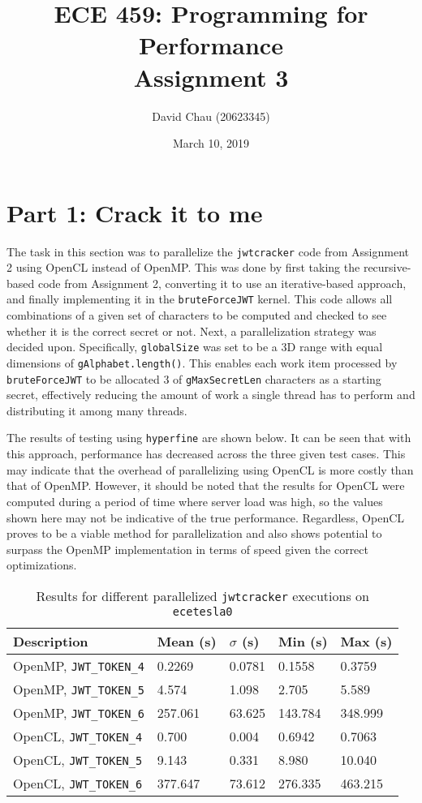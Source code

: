 \documentclass[12pt,reqno]{article}
\title{\vspace{-4cm}ECE 459: Programming for Performance\\Assignment 3\vspace{-2ex}}
\author{David Chau (20623345)\vspace{-2ex}}
\date{\vspace{-2ex}March 10, 2019}
\begin{document}
\maketitle


\section*{Part 1: Crack it to me}

The task in this section was to parallelize the \texttt{jwtcracker} code from Assignment 2 using OpenCL instead of OpenMP. This was done by first taking the recursive-based code from Assignment 2, converting it to use an iterative-based approach, and finally implementing it in the \texttt{bruteForceJWT} kernel. This code allows all combinations of a given set of characters to be computed and checked to see whether it is the correct secret or not. Next, a parallelization strategy was decided upon. Specifically, \texttt{globalSize} was set to be a 3D range with equal dimensions of \texttt{gAlphabet.length()}. This enables each work item processed by \texttt{bruteForceJWT} to be allocated 3 of \texttt{gMaxSecretLen} characters as a starting secret, effectively reducing the amount of work a single thread has to perform and distributing it among many threads.

The results of testing using \texttt{hyperfine} are shown below. It can be seen that with this approach, performance has decreased across the three given test cases. This may indicate that the overhead of parallelizing using OpenCL is more costly than that of OpenMP. However, it should be noted that the results for OpenCL were computed during a period of time where server load was high, so the values shown here may not be indicative of the true performance. Regardless, OpenCL proves to be a viable method for parallelization and also shows potential to surpass the OpenMP implementation in terms of speed given the correct optimizations.

\begin{table}[H]
    \centering
    \caption{Results for different parallelized \texttt{jwtcracker} executions on \texttt{ecetesla0}}
    \label{tab:jwt-results}
    \begin{tabular}{|P{2.5cm}|P{2.5cm}|P{2.5cm}|P{2.5cm}|P{2.5cm}|}
    \hline
    \textbf{Description}& \textbf{Mean (s)} & \textbf{$\sigma$ (s)} & \textbf{Min (s)} & \textbf{Max (s)}\\ \hline 
    OpenMP, \texttt{JWT\_TOKEN\_4} & 0.2269 & 0.0781 & 0.1558 & 0.3759 \\ \hline
    OpenMP, \texttt{JWT\_TOKEN\_5} & 4.574 & 1.098 & 2.705 & 5.589 \\ \hline
    OpenMP, \texttt{JWT\_TOKEN\_6} & 257.061 & 63.625 & 143.784 & 348.999 \\ \hline
    OpenCL, \texttt{JWT\_TOKEN\_4} & 0.700 & 0.004 & 0.6942 & 0.7063 \\ \hline
    OpenCL, \texttt{JWT\_TOKEN\_5} & 9.143 & 0.331 & 8.980 & 10.040 \\ \hline
    OpenCL, \texttt{JWT\_TOKEN\_6} & 377.647 & 73.612 & 276.335 & 463.215 \\ \hline
    \end{tabular}
\end{table}
\end{document}
